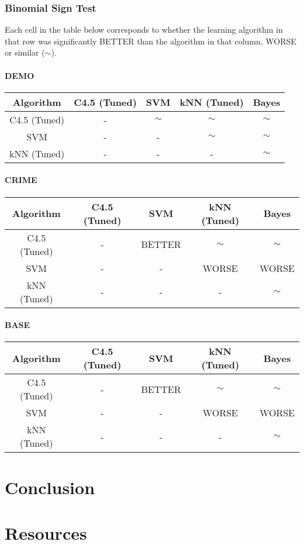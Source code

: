 \documentclass[]{article}
\begin{document}
\subsubsection{Binomial Sign Test}
Each cell in the table below corresponds to whether the learning algorithm in that row was significantly BETTER than the algorithm in that column, WORSE or similar ($\sim$).

\paragraph{DEMO} \quad

\begin{tabular}{|c|c|c|c|c|}
\hline
Algorithm & C4.5 (Tuned) & SVM & kNN (Tuned) & Bayes \\
\hline
C4.5 (Tuned) & - & $\sim$ & $\sim$ & $\sim$ \\
SVM & - & - & $\sim$ & $\sim$ \\
kNN (Tuned) & - & - & - & $\sim$ \\
\hline
\end{tabular}

\paragraph{CRIME} \quad

\begin{tabular}{|c|c|c|c|c|}
\hline
Algorithm & C4.5 (Tuned) & SVM & kNN (Tuned) & Bayes \\
\hline
C4.5 (Tuned) & - & BETTER & $\sim$ & $\sim$ \\
SVM & - & - & WORSE & WORSE \\
kNN (Tuned) & - & - & - & $\sim$ \\
\hline
\end{tabular}

\paragraph{BASE} \quad

\begin{tabular}{|c|c|c|c|c|}
\hline
Algorithm & C4.5 (Tuned) & SVM & kNN (Tuned) & Bayes \\
\hline
C4.5 (Tuned) & - & BETTER & $\sim$ & $\sim$ \\
SVM & - & - & WORSE & WORSE \\
kNN (Tuned) & - & - & - & $\sim$ \\
\hline
\end{tabular}


\section{Conclusion}

\section{Resources}
\end{document}
